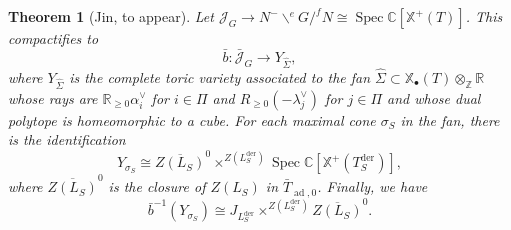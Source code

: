 \documentclass{amsart}
\newtheorem{thm}{Theorem}[section]
\theoremstyle{definition}
\theoremstyle{remark}
\theoremstyle{plain}
\theoremstyle{definition}
\theoremstyle{remark}
\newcommand{\R}{\mathbb{R}}
\newcommand{\C}{\mathbb{C}}
\newcommand{\Z}{\mathbb{Z}}
\newcommand{\mc}[1]{\mathcal{#1}}
\newcommand{\mbb}[1]{\mathbb{#1}}
\newcommand{\on}[1]{\operatorname{#1}}
\newcommand{\ol}[1]{\overline{#1}}
\newcommand{\1}{\mathbf{1}}
\newcommand{\2}{\mathbf{2}}
\newcommand{\3}{\mathbf{3}}
\DeclareMathOperator{\ad}{ad}
\DeclareMathOperator{\Spec}{Spec}
\begin{document}
\begin{thm}[Jin, to appear]
    Let \(\mc{J}_G \to N^- \backslash^e G /^f N \cong \Spec \C[\mbb{X}^+(T)]\). This compactifies to
    \[ \bar{b} \colon \bar{\mc{J}}_G \to Y_{\hat{\Sigma}}, \]
    where \(Y_{\hat{\Sigma}}\) is the complete toric variety associated to the fan \(\hat{\Sigma} \subset \mbb{X}_{\bullet}(T) \otimes_{\Z} \R\)  whose rays are \(\R_{\geq 0} \alpha_i^{\vee}\) for \(i \in \Pi\) and \(R_{\geq 0} (-\lambda_j^{\vee})\) for \(j \in \Pi\) and whose dual polytope is homeomorphic to a cube. For each maximal cone \(\sigma_{S}\) in the fan, there is the identification
    \[ Y_{\sigma_S} \cong \ol{Z(L_S)}^0 \times^{Z(L_S^{\on{der}})} \Spec \C[\mbb{X}^+(T_S^{\on{der}})], \]
    where \(\ol{Z(L_S)}^0\) is the closure of \(Z(L_S)\) in \(\bar{T}_{\ad, 0}\). Finally, we have
    \[ \bar{b}^{-1}(Y_{\sigma_S}) \cong J_{L_S^{\on{der}}} \times^{Z(L_S^{\on{der}})} \ol{Z(L_S)}^0. \]
\end{thm}
\end{document}

